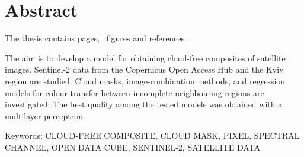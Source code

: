 \chapter*{Abstract}

The thesis contains \pageref{LastPage} pages, \totalfigures\ figures and
 references.

The aim is to develop a model for obtaining cloud-free composites of satellite images.
Sentinel-2 data from the Copernicus Open Access Hub and the Kyiv region are studied.
Cloud masks, image-combination methods, and regression models for colour transfer
between incomplete neighbouring regions are investigated.  The best quality among the
tested models was obtained with a multilayer perceptron.

Keywords: \MakeUppercase{cloud-free composite, cloud mask, pixel, spectral channel, Open
Data Cube, Sentinel-2, satellite data}

